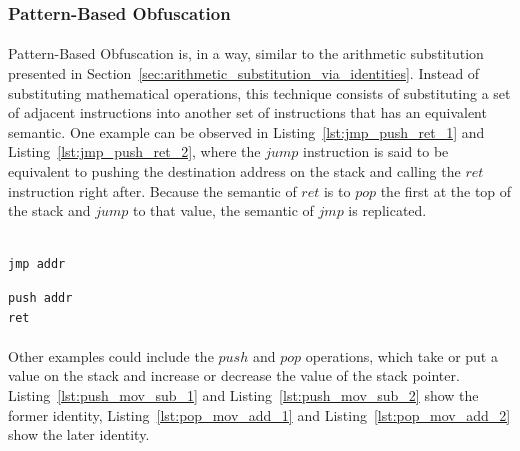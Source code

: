 \subsubsection{Pattern-Based Obfuscation} \label{sec:pattern_based_obfuscation}
\paragraph{}
Pattern-Based Obfuscation is, in a way, similar to the arithmetic substitution presented in Section~\ref{sec:arithmetic_substitution_via_identities}. Instead of substituting mathematical operations, this technique consists of substituting a set of adjacent instructions into another set of instructions that has an equivalent semantic. One example can be observed in Listing~\ref{lst:jmp_push_ret_1} and Listing~\ref{lst:jmp_push_ret_2}, where the $jump$ instruction is said to be equivalent to pushing the destination address on the stack and calling the $ret$ instruction right after. Because the semantic of $ret$ is to $pop$ the first at the top of the stack and $jump$ to that value, the semantic of $jmp$ is replicated. \\ \\

\noindent\begin{minipage}{.45\textwidth}
	\begin{lstlisting}[caption={Program equivalent to the one in Listing~\ref{lst:jmp_push_ret_2}. Semantic equivalence preserved.}, label={lst:jmp_push_ret_1}, frame=tlrb, language={[x86masm]Assembler}, otherkeywords={.CODE}]
jmp addr
	\end{lstlisting}
\end{minipage}\hfill
\begin{minipage}{.45\textwidth}
	\begin{lstlisting}[caption={Program equivalent to the one in Listing~\ref{lst:jmp_push_ret_1}. Semantic equivalence preserved.}, label={lst:jmp_push_ret_2}, frame=tlrb, language={[x86masm]Assembler}]
push addr
ret
	\end{lstlisting}
\end{minipage}

\paragraph{}
Other examples could include the $push$ and $pop$ operations, which take or put a value on the stack and increase or decrease the value of the stack pointer. Listing~\ref{lst:push_mov_sub_1} and Listing~\ref{lst:push_mov_sub_2} show the former identity, Listing~\ref{lst:pop_mov_add_1} and Listing~\ref{lst:pop_mov_add_2} show the later identity.\\ \\


